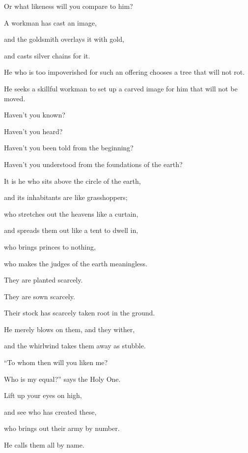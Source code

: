 {\par }{\QB Or what likeness will you compare to him?
\par }{\Q {}A workman has cast an image,
\par }{\QB and the goldsmith overlays it with gold,
\par }{\QB and casts silver chains for it.
\par }{\Q {}He who is too impoverished for such an offering chooses a tree that will not rot.
\par }{\QB He seeks a skillful workman to set up a carved image for him that will not be moved.
\par }{\BB \par }{\Q {}Haven’t you known?
\par }{\QB Haven’t you heard?
\par }{\QB Haven’t you been told from the beginning?
\par }{\QB Haven’t you understood from the foundations of the earth?
\par }{\Q {}It is he who sits above the circle of the earth,
\par }{\QB and its inhabitants are like grasshoppers;
\par }{\QB who stretches out the heavens like a curtain,
\par }{\QB and spreads them out like a tent to dwell in,
\par }{\QB {}who brings princes to nothing,
\par }{\QB who makes the judges of the earth meaningless.
\par }{\Q {}They are planted scarcely.
\par }{\QB They are sown scarcely.
\par }{\QB Their stock has scarcely taken root in the ground.
\par }{\QB He merely blows on them, and they wither,
\par }{\QB and the whirlwind takes them away as stubble.
\par }{\BB \par }{\Q {}“To whom then will you liken me?
\par }{\QB Who is my equal?” says the Holy One.
\par }{\Q {}Lift up your eyes on high,
\par }{\QB and see who has created these,
\par }{\QB who brings out their army by number.
\par }{\QB He calls them all by name.
}
